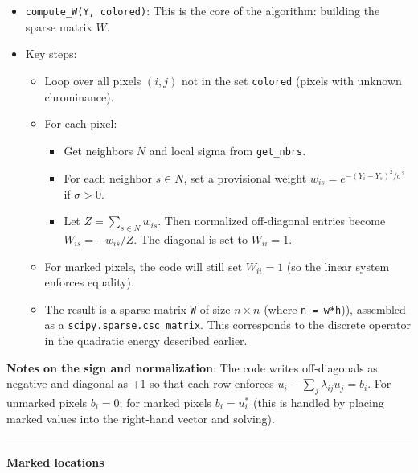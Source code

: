 \documentclass[11pt]{article}
\providecommand{\tightlist}{%
      \setlength{\itemsep}{0pt}\setlength{\parskip}{0pt}}
\begin{document}
\begin{itemize}
\tightlist
\item
  \texttt{compute\_W(Y,\ colored)}: This is the core of the algorithm:
  building the sparse matrix \(W\).
\item
  Key steps:

  \begin{itemize}
  \tightlist
  \item
    Loop over all pixels \((i,j)\) not in the set \texttt{colored}
    (pixels with unknown chrominance).
  \item
    For each pixel:

    \begin{itemize}
    \tightlist
    \item
      Get neighbors \(N\) and local sigma from \texttt{get\_nbrs}.
    \item
      For each neighbor \(s\in N\), set a provisional weight
      \(w_{is} = e^{-(Y_i - Y_s)^2 / \sigma^2}\) if \(\sigma>0\).
    \item
      Let \(Z = \sum\limits_{s\in N} w_{is}\). Then normalized
      off-diagonal entries become \(W_{is} = -w_{is}/Z\). The diagonal
      is set to \(W_{ii}=1\).
    \end{itemize}
  \item
    For marked pixels, the code will still set \(W_{ii}=1\) (so the
    linear system enforces equality).
  \item
    The result is a sparse matrix \texttt{W} of size \(n\times n\)
    (where \texttt{n\ =\ w*h})), assembled as a
    \texttt{scipy.sparse.csc\_matrix}. This corresponds to the discrete
    operator in the quadratic energy described earlier.
  \end{itemize}
\end{itemize}

\textbf{Notes on the sign and normalization}: The code writes
off-diagonals as negative and diagonal as +1 so that each row enforces
\(u_i - \sum_{j} \lambda_{ij} u_j = b_i\). For unmarked pixels
\(b_i=0\); for marked pixels \(b_i=u_i^*\) (this is handled by placing
marked values into the right-hand vector and solving).

\begin{center}\rule{0.5\linewidth}{0.5pt}\end{center}

\hypertarget{marked-locations}{%
\paragraph{\texorpdfstring{\textbf{Marked
locations}}{Marked locations}}\label{marked-locations}}
\end{document}
